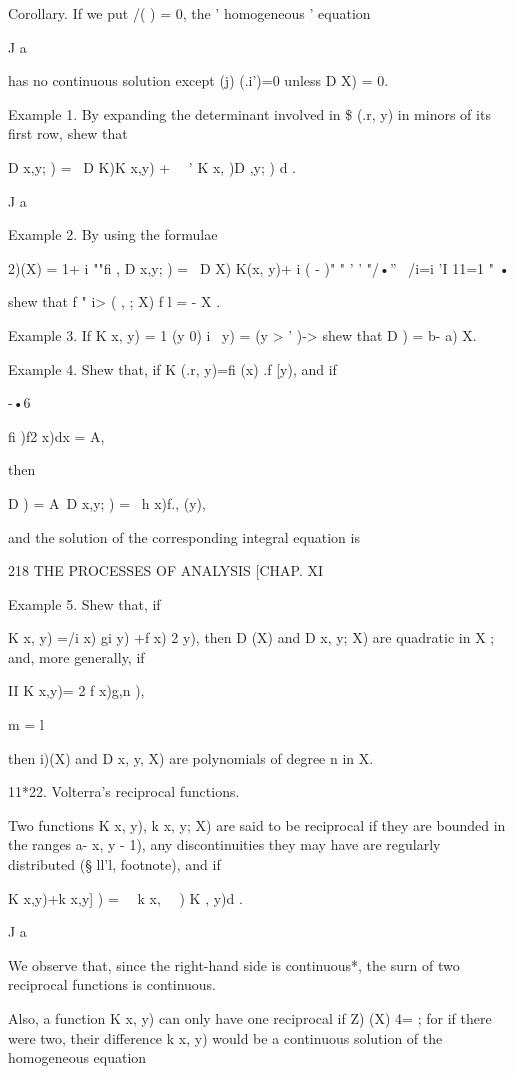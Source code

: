 Corollary. If we put /( ) = 0, the ' homogeneous ' equation

J a

has no continuous solution except (j) (.i')=0 unless D X) = 0.

Example 1. By expanding the determinant involved in \$ (.r, y) in
minors of its first row, shew that

D x,y; ) = \ D K)K x,y) + \ \ ' K x, )D ,y; ) d .

J a

Example 2. By using the formulae

2)(X) = 1+ i ""fi , D x,y; ) = \ D X) K(x, y)+ i ( - )" " ' ' "/•'' \
/i=i 'I 11=1 " •

shew that f " i> ( , ; X) f l = - X .

Example 3. If K x, y) = 1 (y 0) i \ y) = (y > ' )-> shew that D ) = b-
a) X.

Example 4. Shew that, if K (.r, y)=fi (x) .f [y), and if

-•6

fi )f2 x)dx = A,



then

D ) = A\ D x,y; ) = \ h x)f., (y),

and the solution of the corresponding integral equation is



218 THE PROCESSES OF ANALYSIS [CHAP. XI

Example 5. Shew that, if

K x, y) =/i x) gi y) +f x) 2 y), then D (X) and D x, y; X) are
quadratic in X ; and, more generally, if

II K x,y)= 2 f x)g,n ),

m = l

then i)(X) and D x, y, X) are polynomials of degree n in X.

11*22. Volterra's reciprocal functions.

Two functions K x, y), k x, y; X) are said to be reciprocal if they
are bounded in the ranges a- x, y - 1), any discontinuities they may
have are regularly distributed (§ ll'l, footnote), and if

K x,y)+k x,y] ) = \ \ k x, \ \ ) K , y)d .

J a

We observe that, since the right-hand side is continuous*, the surn of
two reciprocal functions is continuous.

Also, a function K x, y) can only have one reciprocal if Z) (X) 4= ;
for if there were two, their difference k x, y) would be a continuous
solution of the homogeneous equation

